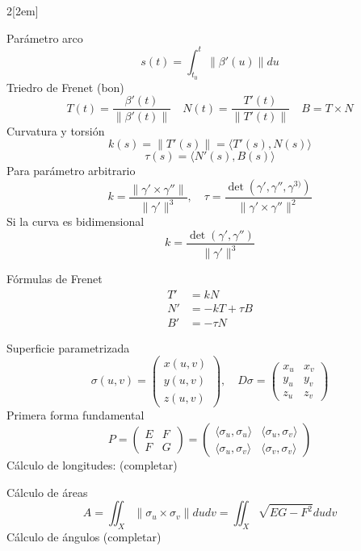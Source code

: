 \documentclass{myclass}
\begin{document}
\begin{multicols}{2}[\columnsep2em]

Parámetro arco 
\[
s(t) = \int_{t_0}^t \|\beta' (u)\| du
\]
Triedro de Frenet (bon)
 \[
   T(t) = \frac{\beta'(t)}{\|\beta'(t)\|} \quad N(t) =
\frac{T'(t)}{\|T'(t)\|} \quad
B = T\times N
\] 
Curvatura y torsión
 \[
k(s) = \|T'(s)\|= \langle T'(s) , N(s) \rangle
\]
\[
  \tau(s) = \langle N'(s) , B(s) \rangle 
\]
Para parámetro arbitrario
\[
k = \frac{\|\gamma' \times \gamma''\|}{\|\gamma'\|^3}, \quad \tau = \frac{\det\left( \gamma', \gamma'', \gamma^{3)} \right) }{\|\gamma'\times \gamma''\|^2}
\]
Si la curva es bidimensional
\[
k = \frac{\det(\gamma',\gamma'')}{\|\gamma'\|^3}
\] 

Fórmulas de Frenet
\begin{align*}
  T' &= kN \\
  N' &= -kT + \tau B \\
  B' &= -\tau N 
\end{align*}

Superficie parametrizada
\[
\sigma(u, v) = \begin{pmatrix} x(u, v) \\ y(u, v) \\ z(u, v) \end{pmatrix}, \quad D\sigma = \begin{pmatrix} x_u & x_v \\ y_u & y_v \\ z_u & z_v \end{pmatrix}
\]
Primera forma fundamental
\[
P =   \begin{pmatrix} E & F \\ F & G \end{pmatrix} = \begin{pmatrix} \langle \sigma_u , \sigma_u \rangle & \langle \sigma_u , \sigma_v \rangle \\ \langle \sigma_u , \sigma_v \rangle & \langle \sigma_v , \sigma_v \rangle   \end{pmatrix} 
\]
Cálculo de longitudes:
(completar)

Cálculo de áreas
\[
A = \iint_X\|\sigma _u\times \sigma _v\|dudv=  \iint_X \sqrt{EG-F^2}dudv
\]
Cálculo de ángulos
(completar)


\end{multicols}
\end{document}
